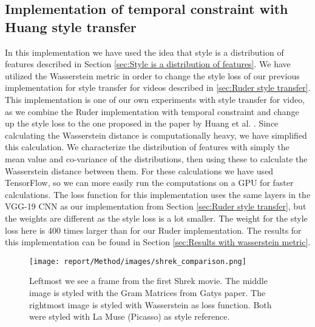 \subsection{Implementation of temporal constraint with Huang style transfer}
In this implementation we have used the idea that style is a distribution of features described in Section \ref{sec:Style is a distribution of features}. We have utilized the Wasserstein metric in order to change the style loss of our previous implementation for style transfer for videos described in \ref{sec:Ruder style transfer}. This implementation is one of our own experiments with style transfer for video, as we combine the Ruder implementation with temporal constraint and change up the style loss to the one proposed in the paper by Huang et al. \cite{Huang:1}. 
\newline\newline
Since calculating the Wasserstein distance is computationally heavy, we have simplified this calculation. We characterize the distribution of features with simply the mean value and co-variance of the distributions, then using these to calculate the Wasserstein distance between them. For these calculations we have used TensorFlow, so we can more easily run the computations on a GPU for faster calculations.\newline\newline
The loss function for this implementation uses the same layers in the VGG-19 CNN as our implementation from Section \ref{sec:Ruder style transfer}, but the weights are different as the style loss is a lot smaller. The weight for the style loss here is 400 times larger than for our Ruder implementation. The results for this implementation can be found in Section \ref{sec:Results with wasserstein metric}.
\begin{figure}[!ht]
\begin{center}
\texttt{[image: report/Method/images/shrek\_comparison.png]}
\caption{Leftmost we see a frame from the first Shrek movie. The middle image is styled with the Gram Matrices from Gatys paper. The rightmost image is styled with Wasserstein as loss function. Both were styled with La Muse (Picasso) as style reference.}
\label{fig:architecture}
\end{center}
\end{figure}
